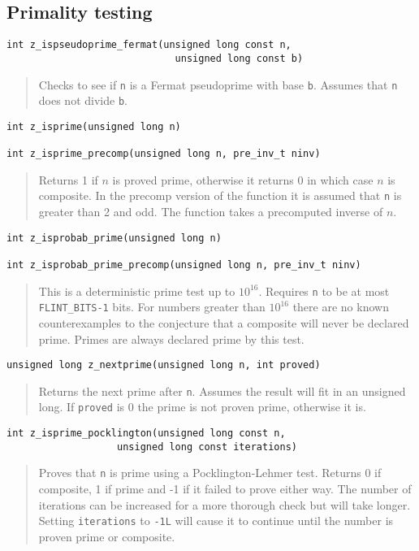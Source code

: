 \documentclass[a4paper,10pt]{article}
\newcommand{\code}{\lstinline}
\begin{document}
\subsection{Primality testing}

\begin{lstlisting}
int z_ispseudoprime_fermat(unsigned long const n,
                             unsigned long const b)
\end{lstlisting}
\begin{quote}
Checks to see if \code{n} is a Fermat pseudoprime with base \code{b}.  Assumes that \code{n} does not divide \code{b}. 
\end{quote}

\begin{lstlisting}
int z_isprime(unsigned long n)

int z_isprime_precomp(unsigned long n, pre_inv_t ninv)
\end{lstlisting}
\begin{quote}
Returns 1 if $n$ is proved prime, otherwise it returns 0 in which case $n$ is composite. In the precomp version of the function it is assumed that \code{n} is greater than 2 and odd. The function takes a precomputed inverse of $n$.
\end{quote}

\begin{lstlisting}
int z_isprobab_prime(unsigned long n)

int z_isprobab_prime_precomp(unsigned long n, pre_inv_t ninv)
\end{lstlisting}
\begin{quote}
This is a deterministic prime test up to $10^{16}$. Requires \code{n} to be at most \code{FLINT_BITS-1} bits.  For numbers greater than $10^{16}$ there are no known counterexamples to the conjecture that a composite will never be declared prime. Primes are always declared prime by this test.
\end{quote}

\begin{lstlisting}
unsigned long z_nextprime(unsigned long n, int proved)
\end{lstlisting}
\begin{quote}
Returns the next prime after \code{n}.  Assumes the result will fit in an unsigned long.  If \code{proved} is 0 the prime is not proven prime, otherwise it is.
\end{quote}

\begin{lstlisting}
int z_isprime_pocklington(unsigned long const n,
                   unsigned long const iterations)
\end{lstlisting}
\begin{quote}
Proves that \code{n} is prime using a Pocklington-Lehmer test. Returns 0 if composite, 1 if prime and -1 if it failed to prove either way. The number of iterations can be increased for a more thorough check but will take longer. Setting \code{iterations} to \code{-1L} will cause it to continue until the number is proven prime or composite.
\end{quote}
\end{document}
